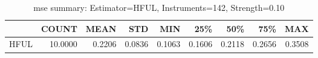 \begin{table}[ht]
\centering
\caption{mse summary: Estimator=HFUL, Instruments=142, Strength=0.10}
\begin{tabular}{lrrrrrrrr}
\toprule
 & COUNT & MEAN & STD & MIN & 25\% & 50\% & 75\% & MAX \\
\midrule
HFUL & 10.0000 & 0.2206 & 0.0836 & 0.1063 & 0.1606 & 0.2118 & 0.2656 & 0.3508 \\
\bottomrule
\end{tabular}
\end{table}
